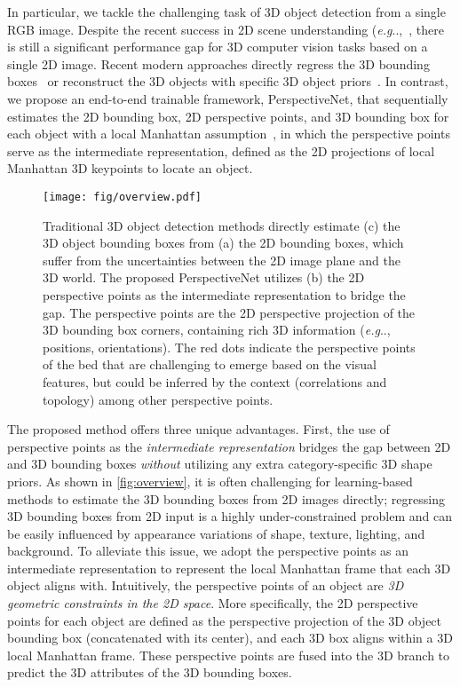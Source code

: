 \documentclass{article}
\makeatletter
\DeclareRobustCommand\onedot{\futurelet\@let@token\@onedot}
\def\@onedot{\ifx\@let@token.\else.\null\fi\xspace}
\def\eg{\emph{e.g}\onedot} \def\Eg{\emph{E.g}\onedot}
\makeatother
\begin{document}
In particular, we tackle the challenging task of 3D object detection from a single RGB image. Despite the recent success in 2D scene understanding (\eg,~\cite{ren2015faster,he2017mask}, there is still a significant performance gap for 3D computer vision tasks based on a single 2D image. Recent modern approaches directly regress the 3D bounding boxes~\cite{chen2016monocular,mousavian20173d,huang2018cooperative} or reconstruct the 3D objects with specific 3D object priors~\cite{kundu20183d,huang2018holistic,yao20183d,he2019mono3d++}. In contrast, we propose an end-to-end trainable framework, PerspectiveNet, that sequentially estimates the 2D bounding box, 2D perspective points, and 3D bounding box for each object with a local Manhattan assumption~\cite{xiao2014reconstructing}, in which the perspective points serve as the intermediate representation, defined as the 2D projections of local Manhattan 3D keypoints to locate an object.

\begin{figure}[t!]
    \begin{center}
        \texttt{[image: fig/overview.pdf]}
    \end{center}
    \caption{Traditional 3D object detection methods directly estimate (c) the 3D object bounding boxes from (a) the 2D bounding boxes, which suffer from the uncertainties between the 2D image plane and the 3D world. The proposed PerspectiveNet utilizes (b) the 2D perspective points as the intermediate representation to bridge the gap. The perspective points are the 2D perspective projection of the 3D bounding box corners, containing rich 3D information (\eg, positions, orientations). The red dots indicate the perspective points of the bed that are challenging to emerge based on the visual features, but could be inferred by the context (correlations and topology) among other perspective points.}
    \label{fig:overview}
\end{figure}

The proposed method offers three unique advantages. First, the use of perspective points as the \emph{intermediate representation} bridges the gap between 2D and 3D bounding boxes \emph{without} utilizing any extra category-specific 3D shape priors. As shown in \autoref{fig:overview}, it is often challenging for learning-based methods to estimate the 3D bounding boxes from 2D images directly; regressing 3D bounding boxes from 2D input is a highly under-constrained problem and can be easily influenced by appearance variations of shape, texture, lighting, and background. To alleviate this issue, we adopt the perspective points as an intermediate representation to represent the local Manhattan frame that each 3D object aligns with. Intuitively, the perspective points of an object are \emph{3D geometric constraints in the 2D space}. More specifically, the 2D perspective points for each object are defined as the perspective projection of the 3D object bounding box (concatenated with its center), and each 3D box aligns within a 3D local Manhattan frame. These perspective points are fused into the 3D branch to predict the 3D attributes of the 3D bounding boxes.
\end{document}
